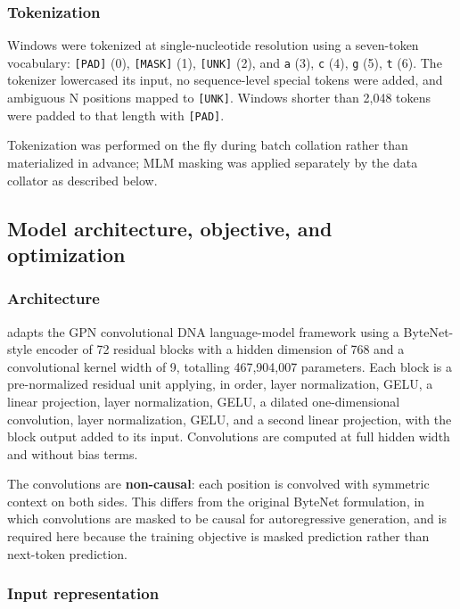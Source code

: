 \subsubsection*{Tokenization}

Windows were tokenized at single-nucleotide resolution using a seven-token
vocabulary: \texttt{[PAD]} (0), \texttt{[MASK]} (1), \texttt{[UNK]} (2), and
\texttt{a} (3), \texttt{c} (4), \texttt{g} (5), \texttt{t} (6). The tokenizer
lowercased its input, no sequence-level special tokens were added, and
ambiguous N positions mapped to \texttt{[UNK]}. Windows shorter than 2,048
tokens were padded to that length with \texttt{[PAD]}.

Tokenization was performed on the fly during batch collation rather than
materialized in advance; MLM masking was applied separately by the data
collator as described below.


\subsection*{Model architecture, objective, and optimization}

\subsubsection*{Architecture}

\model adapts the GPN convolutional DNA language-model framework
\cite{benegas2023dna} using a ByteNet-style encoder \cite{kalchbrenner2016neural}
of 72 residual blocks with a hidden dimension of 768 and a convolutional
kernel width of 9, totalling 467,904,007 parameters. Each block is a
pre-normalized residual unit applying, in order, layer normalization, GELU, a
linear projection, layer normalization, GELU, a dilated one-dimensional
convolution, layer normalization, GELU, and a second linear projection, with
the block output added to its input. Convolutions are computed at full hidden
width and without bias terms.

The convolutions are \textbf{non-causal}: each position is convolved with
symmetric context on both sides. This differs from the original ByteNet
formulation, in which convolutions are masked to be causal for autoregressive
generation, and is required here because the training objective is masked
prediction rather than next-token prediction.

\subsubsection*{Input representation}

